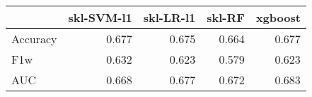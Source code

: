 \begin{tabular}{lrrrr}
\toprule
{} &  skl-SVM-l1 &  skl-LR-l1 &  skl-RF &  xgboost \\
\midrule
Accuracy &       0.677 &      0.675 &   0.664 &    0.677 \\
F1w      &       0.632 &      0.623 &   0.579 &    0.623 \\
AUC      &       0.668 &      0.677 &   0.672 &    0.683 \\
\bottomrule
\end{tabular}
